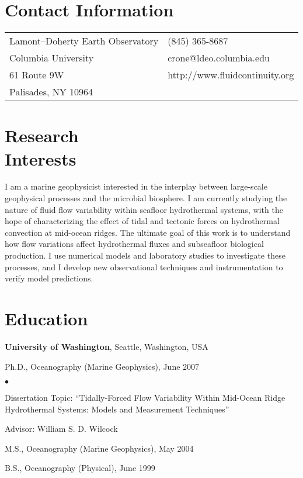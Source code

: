 \documentclass[11pt]{res}
\newenvironment{list1}{
 \begin{list}{\ding{113}}{%
      \setlength{\itemsep}{0in}
      \setlength{\parsep}{0in} \setlength{\parskip}{0in}
      \setlength{\topsep}{0in} \setlength{\partopsep}{0in} 
      \setlength{\leftmargin}{0.17in}}}{\end{list}}
\newenvironment{list2}{
  \begin{list}{$\bullet$}{%
      \setlength{\itemsep}{0in}
      \setlength{\parsep}{0in} \setlength{\parskip}{0in}
      \setlength{\topsep}{0in} \setlength{\partopsep}{0in} 
      \setlength{\leftmargin}{0.2in}}}{\end{list}}
\begin{document}

\begin{resume}
\section{\sc Contact Information}
\vspace{0.05in}
\begin{tabular}{@{}p{2.5in}p{3in}}
Lamont--Doherty Earth Observatory	& (845) 365-8687 \\ 
Columbia University			& crone@ldeo.columbia.edu\\         
61 Route 9W				& http://www.fluidcontinuity.org\\
Palisades, NY 10964			& \\     
\end{tabular}

\section{\sc Research\\Interests}
I am a marine geophysicist interested in the interplay between large-scale geophysical processes and the microbial biosphere. I am currently studying the nature of fluid flow variability within seafloor hydrothermal systems, with the hope of characterizing the effect of tidal and tectonic forces on hydrothermal convection at mid-ocean ridges. The ultimate goal of this work is to understand how flow variations affect hydrothermal fluxes and subseafloor biological production. I use numerical models and laboratory studies to investigate these processes, and I develop new observational techniques and instrumentation to verify model predictions.

\section{\sc Education}
{\bf University of Washington}, Seattle, Washington, USA\\
\vspace*{-.1in}
\begin{list1}
\item[] Ph.D., Oceanography (Marine Geophysics), June 2007
\begin{list2}
\vspace*{.05in}
\item Dissertation Topic: ``Tidally-Forced Flow Variability Within Mid-Ocean Ridge
Hydrothermal Systems: Models and Measurement Techniques'' 
\item Advisor: William S. D. Wilcock
\end{list2}
\vspace*{.05in}
\item[] M.S., Oceanography (Marine Geophysics), May 2004
\vspace*{.05in}
\item[] B.S., Oceanography (Physical), June 1999
\end{list1}


\end{resume}
\end{document}

